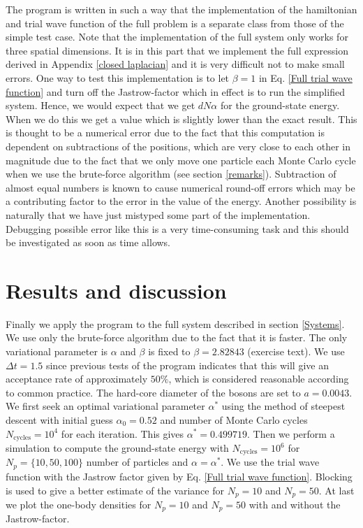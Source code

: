 \documentclass[a4paper,10pt]{article}
\begin{document}
The program is written in such a way that the implementation of the hamiltonian and trial wave function of the full problem 
is a separate class from those of the simple test case.
Note that the implementation of the full system only works for three spatial dimensions. It is in this part that we implement the full expression derived in Appendix \ref{closed laplacian} and it is very difficult not to make small errors. 
One way to test this implementation is to let $\beta = 1$ in Eq. \ref{Full trial wave function} and turn off the Jastrow-factor which in effect is to run the simplified
system. Hence, we would expect that we get $dN\alpha$ for the ground-state energy. When we do this we get a value which is slightly lower than the exact result.
This is thought to be a numerical error due to the fact that this computation is dependent 
on subtractions of the positions, which are very close to each other in magnitude due to the fact that we only move one particle each Monte Carlo cycle when we use 
the brute-force algorithm (see section \ref{remarks}). Subtraction of almost equal numbers is known to cause numerical round-off errors which may be 
a contributing factor to the error in the value of the energy. Another possibility is naturally that we have just mistyped some part of the implementation.
Debugging possible error like this is a very time-consuming task and this should be investigated as soon as time allows.
\section{Results and discussion}
Finally we apply the program to the full system described in section \ref{Systems}. We use only the brute-force algorithm
due to the fact that it is faster. The only variational parameter is $\alpha$ and $\beta$ is fixed to $\beta = 2.82843$ (exercise text). We use $\Delta t = 1.5$ since previous tests of the 
program indicates that this will give an acceptance rate of approximately $50\%$, which is considered reasonable according to common practice. The hard-core diameter of the bosons are set to
$a = 0.0043$. We first seek an optimal variational parameter $\alpha^*$ using 
the method of steepest descent with initial guess $\alpha_0 = 0.52$ and number of Monte Carlo cycles $N_{\text{cycles}} = 10^4$ for each iteration. This gives $\alpha^* = 0.499719$. Then we perform a 
simulation to compute the ground-state energy with $N_{\text{cycles}} = 10^6$ for $N_p = \{10,50,100\}$ number of
particles and $\alpha = \alpha^*$. We use the trial wave function with the Jastrow factor given by Eq. \ref{Full trial wave function}. Blocking is used to give a better estimate of the variance for $N_p = 10$ and $N_p = 50$. At last we plot
the one-body densities for $N_p = 10$ and $N_p = 50$ with and without the Jastrow-factor.
\end{document}
